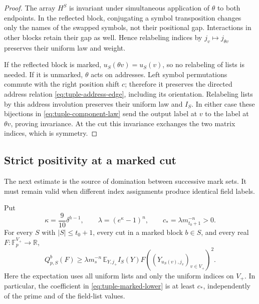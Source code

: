 \begin{proof}
The array \(H^S\) is invariant under simultaneous application of
\(\theta\) to both endpoints.  In the reflected block, conjugating
a symbol transposition changes only the names of the swapped symbols,
not their positional gap.  Interactions in other blocks retain their
gap as well.  Hence relabeling indices by \(j_v\mapsto j_{\theta v}\)
preserves their uniform law and weight.

If the reflected block is marked, \(u_S(\theta v)=u_S(v)\), so
no relabeling of lists is needed.  If it is unmarked, \(\theta\)
acts on addresses.  Left symbol permutations commute with the right
position shift \(c\); therefore it preserves the directed address
relation \eqref{eq:tuple-address-edge}, including its orientation.
Relabeling lists by this address involution preserves their uniform
law and \(I_S\).  In either case these bijections in
\eqref{eq:tuple-component-law} send the output label at \(v\) to
the label at \(\theta v\), proving invariance.  At the cut this
invariance exchanges the two matrix indices, which is symmetry.
\end{proof}

\subsection{Strict positivity at a marked cut}

The next estimate is the source of domination between successive
mark sets.  It must remain valid when different index assignments
produce identical field labels.

\begin{lemma}
\label{lem:marked-positive}
Put
\[
 \kappa=\frac9{10}\delta^{h-1},\qquad
 \lambda=(e^\kappa-1)^n,\qquad
 c_* =\lambda m_{t_0+1}^{-n}>0.
\]
For every \(S\) with \(|S|\le t_0+1\), every cut in a marked block
\(b\in S\), and every real \(F:\mathbb F_p^{V_+}\to\mathbb R\),
\begin{equation}
 Q_{p,S}^{b}(F)
 \ge \lambda m_s^{-n}\,
 \mathbb E_{Y,j_+}I_S(Y)
 F((Y_{u_S(v),j_v})_{v\in V_+})^2.
 \label{eq:tuple-marked-lower}
\end{equation}
Here the expectation uses all uniform lists and only the uniform
indices on \(V_+\).  In particular, the coefficient in
\eqref{eq:tuple-marked-lower} is at least \(c_*\), independently
of the prime and of the field-list values.
\end{lemma}

